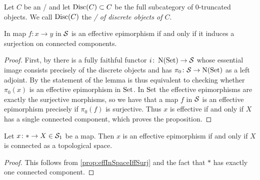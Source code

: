\begin{definition}
    Let $C$ be an \inftytop/ and let $\operatorname{Disc}(C)\subset C$ be the full subcategory of $0$-truncated objects.
    We call $\operatorname{Disc}(C)$ the \emph{\inftycat/ of discrete objects of $C$}.
\end{definition}
\begin{prop}\label{prop:effInSpaceIffSurj}
    In map $f\colon x\to y$ in $\mathcal{S}$ is an effective epimorphism if and only if it induces a surjection on connected components.
    \begin{proof}
        First, by \cite[Proposition 7.8.3]{cisinski_2019} there is a fully faithful functor $i\colon\operatorname{N}(\operatorname{Set})\to\mathcal{S}$ whose essential image consists precisely of the discrete objects and has $\pi_0\colon\mathcal{S}\to\operatorname{N}(\operatorname{Set})$ as a left adjoint.
        By \cite[Proposition 7.2.1.14]{HTT} the statement of the lemma is thus equivalent to checking whether $\pi_0(x)$ is an effective epimorphism in $\operatorname{Set}$.
        In $\operatorname{Set}$ the effective epimorphisms are exactly the surjective morphisms, so we have that a map $f$ in $\mathcal{S}$ is an effective epimorphism precisely if $\pi_0(f)$ is surjective.
        Thus $x$ is effective if and only if $X$ has a single connected component, which proves the proposition.
    \end{proof}
\end{prop}
\begin{corollary}
    Let $x\colon*\to X\in\mathcal{S}_1$ be a map.
    Then $x$ is an effective epimorphism if and only if $X$ is connected as a topological space.
    \begin{proof}
        This follows from \cref{prop:effInSpaceIffSurj} and the fact that $*$ has exactly one connected component.
    \end{proof}
\end{corollary}
